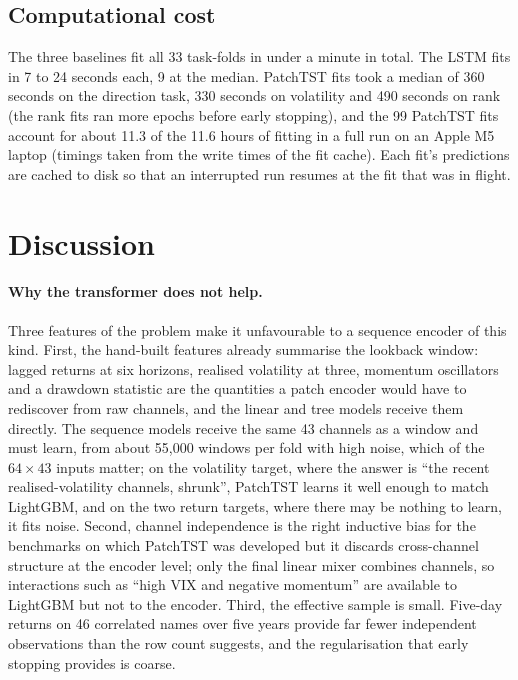 \documentclass[10pt,a4paper,twoside,twocolumn]{article}
\begin{document}
\subsection{Computational cost}

The three baselines fit all 33 task-folds in under a minute in total. The LSTM fits in 7 to 24 seconds each, 9 at the median. PatchTST fits took a median of 360 seconds on the direction task, 330 seconds on volatility and 490 seconds on rank (the rank fits ran more epochs before early stopping), and the 99 PatchTST fits account for about 11.3 of the 11.6 hours of fitting in a full run on an Apple M5 laptop (timings taken from the write times of the fit cache). Each fit's predictions are cached to disk so that an interrupted run resumes at the fit that was in flight.

\section{Discussion}\label{sec:discussion}

\paragraph{Why the transformer does not help.} Three features of the problem make it unfavourable to a sequence encoder of this kind. First, the hand-built features already summarise the lookback window: lagged returns at six horizons, realised volatility at three, momentum oscillators and a drawdown statistic are the quantities a patch encoder would have to rediscover from raw channels, and the linear and tree models receive them directly. The sequence models receive the same 43 channels as a window and must learn, from about 55{,}000 windows per fold with high noise, which of the $64\times43$ inputs matter; on the volatility target, where the answer is ``the recent realised-volatility channels, shrunk'', PatchTST learns it well enough to match LightGBM, and on the two return targets, where there may be nothing to learn, it fits noise. Second, channel independence is the right inductive bias for the benchmarks on which PatchTST was developed but it discards cross-channel structure at the encoder level; only the final linear mixer combines channels, so interactions such as ``high VIX and negative momentum'' are available to LightGBM but not to the encoder. Third, the effective sample is small. Five-day returns on 46 correlated names over five years provide far fewer independent observations than the row count suggests, and the regularisation that early stopping provides is coarse.
\end{document}
